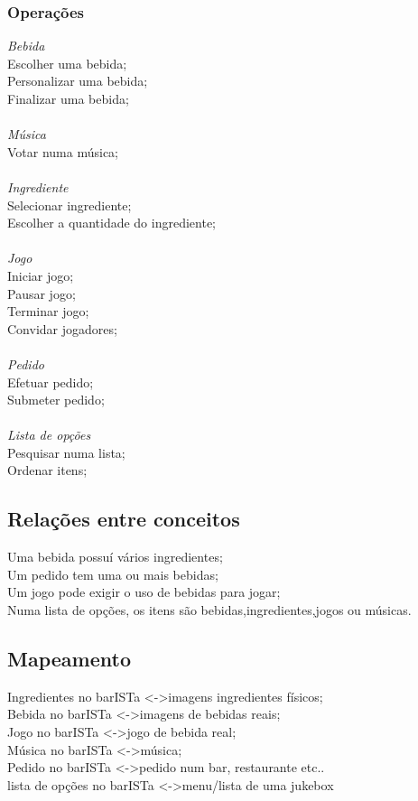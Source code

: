 \documentclass{article}
\begin{document}
\subsubsection*{Operações}
\textit{Bebida}\\
\indent Escolher uma bebida;\\
\indent	Personalizar uma bebida;\\
\indent	Finalizar uma bebida;\\
\\
\textit{Música}\\
\indent	Votar numa música;\\
\\
\textit{Ingrediente}\\
\indent	Selecionar ingrediente;\\
\indent	Escolher a quantidade do ingrediente;\\
\\
\textit{Jogo}\\
\indent	Iniciar jogo;\\
\indent	Pausar jogo;\\
\indent	Terminar jogo;\\
\indent	Convidar jogadores;\\
\\
\textit{Pedido}\\
\indent	Efetuar pedido;\\
\indent	Submeter pedido;\\
\\
\textit{Lista de opções}\\
\indent	Pesquisar numa lista;\\
\indent	Ordenar itens;\\

\subsection*{Relações entre conceitos}
Uma bebida possuí vários ingredientes;\\
Um pedido tem uma ou mais bebidas;\\
Um jogo pode exigir o uso de bebidas para jogar;\\
Numa lista de opções, os itens são bebidas,ingredientes,jogos ou músicas.\\



\subsection*{Mapeamento}
Ingredientes no barISTa \textless -\textgreater imagens ingredientes físicos;\\
Bebida no barISTa \textless -\textgreater   imagens de bebidas reais;\\
Jogo no barISTa \textless -\textgreater  jogo de bebida real;\\
Música no barISTa \textless -\textgreater  música; \\
Pedido no barISTa \textless -\textgreater  pedido num bar, restaurante etc..\\
lista de opções no barISTa \textless -\textgreater menu/lista de uma jukebox \\
\end{document}
